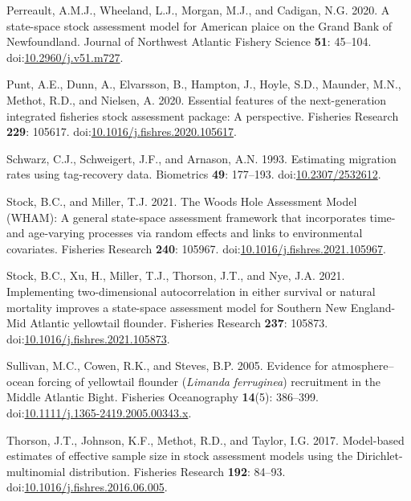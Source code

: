 \documentclass[
]{article}
\newlength{\cslhangindent}
\newlength{\cslentryspacingunit} %
\newenvironment{CSLReferences}[2] %
 {%
  \setlength{\parindent}{0pt}
  \ifodd #1
  \let\oldpar\par
  \def\par{\hangindent=\cslhangindent\oldpar}
  \fi
  \setlength{\parskip}{#2\cslentryspacingunit}
 }%
 {}
\begin{document}
\begin{CSLReferences}{1}{0}
\leavevmode{}%
Perreault, A.M.J., Wheeland, L.J., Morgan, M.J., and Cadigan, N.G. 2020.
A state-space stock assessment model for {American} plaice on the
{Grand} {Bank} of {Newfoundland}. Journal of Northwest Atlantic Fishery
Science \textbf{51}: 45--104.
doi:\href{https://doi.org/10.2960/j.v51.m727}{10.2960/j.v51.m727}.

\leavevmode{}%
Punt, A.E., Dunn, A., Elvarsson, B., Hampton, J., Hoyle, S.D., Maunder,
M.N., Methot, R.D., and Nielsen, A. 2020. Essential features of the
next-generation integrated fisheries stock assessment package: A
perspective. Fisheries Research \textbf{229}: 105617.
doi:\href{https://doi.org/10.1016/j.fishres.2020.105617}{10.1016/j.fishres.2020.105617}.

\leavevmode{}%
Schwarz, C.J., Schweigert, J.F., and Arnason, A.N. 1993. Estimating
migration rates using tag-recovery data. Biometrics \textbf{49}:
177--193. doi:\href{https://doi.org/10.2307/2532612}{10.2307/2532612}.

\leavevmode{}%
Stock, B.C., and Miller, T.J. 2021. The {Woods Hole Assessment Model}
({WHAM}): A general state-space assessment framework that incorporates
time- and age-varying processes via random effects and links to
environmental covariates. Fisheries Research \textbf{240}: 105967.
doi:\href{https://doi.org/10.1016/j.fishres.2021.105967}{10.1016/j.fishres.2021.105967}.

\leavevmode{}%
Stock, B.C., Xu, H., Miller, T.J., Thorson, J.T., and Nye, J.A. 2021.
Implementing two-dimensional autocorrelation in either survival or
natural mortality improves a state-space assessment model for {Southern
New England}-{Mid Atlantic} yellowtail flounder. Fisheries Research
\textbf{237}: 105873.
doi:\href{https://doi.org/10.1016/j.fishres.2021.105873}{10.1016/j.fishres.2021.105873}.

\leavevmode{}%
Sullivan, M.C., Cowen, R.K., and Steves, B.P. 2005. Evidence for
atmosphere{--}ocean forcing of yellowtail flounder (\emph{{L}imanda}
\emph{ferruginea}) recruitment in the {M}iddle {A}tlantic {B}ight.
Fisheries Oceanography \textbf{14}(5): 386--399.
doi:\href{https://doi.org/10.1111/j.1365-2419.2005.00343.x}{10.1111/j.1365-2419.2005.00343.x}.

\leavevmode{}%
Thorson, J.T., Johnson, K.F., Methot, R.D., and Taylor, I.G. 2017.
Model-based estimates of effective sample size in stock assessment
models using the {D}irichlet-multinomial distribution. Fisheries
Research \textbf{192}: 84--93.
doi:\href{https://doi.org/10.1016/j.fishres.2016.06.005}{10.1016/j.fishres.2016.06.005}.


\end{CSLReferences}
\end{document}
